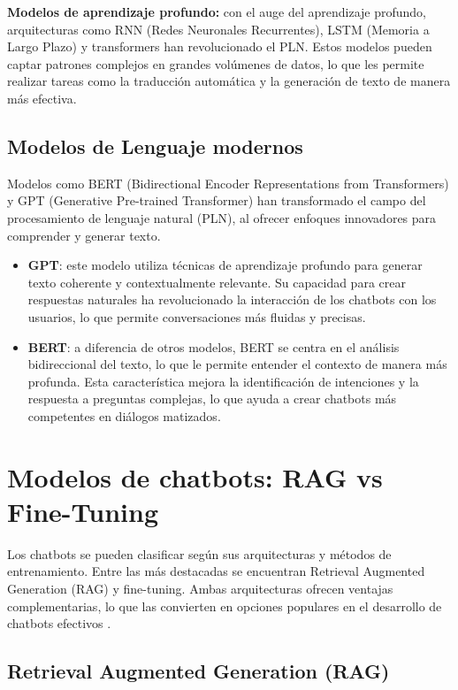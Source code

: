   \textbf{Modelos de aprendizaje profundo:} con el auge del aprendizaje profundo, arquitecturas como RNN (Redes Neuronales Recurrentes), LSTM (Memoria a Largo Plazo) y transformers han revolucionado el PLN. Estos modelos pueden captar patrones complejos en grandes volúmenes de datos, lo que les permite realizar tareas como la traducción automática y la generación de texto de manera más efectiva.
  

  \subsection{Modelos de Lenguaje modernos}

  Modelos como BERT (Bidirectional Encoder Representations from Transformers) y GPT (Generative Pre-trained Transformer) han transformado el campo del procesamiento de lenguaje natural (PLN), al ofrecer enfoques innovadores para comprender y generar texto.
  
  \begin{itemize}
	  \item \textbf{GPT}: este modelo utiliza técnicas de aprendizaje profundo para generar texto coherente y contextualmente relevante. Su capacidad para crear respuestas naturales ha revolucionado la interacción de los chatbots con los usuarios, lo que permite conversaciones más fluidas y precisas.
  
	  \item \textbf{BERT}: a diferencia de otros modelos, BERT se centra en el análisis bidireccional del texto, lo que le permite entender el contexto de manera más profunda. Esta característica mejora la identificación de intenciones y la respuesta a preguntas complejas, lo que ayuda a crear chatbots más competentes en diálogos matizados.
  \end{itemize}
  

  \section{Modelos de chatbots: RAG vs Fine-Tuning}
  
  Los chatbots se pueden clasificar según sus arquitecturas y métodos de entrenamiento. Entre las más destacadas se encuentran Retrieval Augmented Generation (RAG) y fine-tuning. Ambas arquitecturas ofrecen ventajas complementarias, lo que las convierten en opciones populares en el desarrollo de chatbots efectivos \cite{greyling2023}.



  
  \subsection{Retrieval Augmented Generation (RAG)}
  
